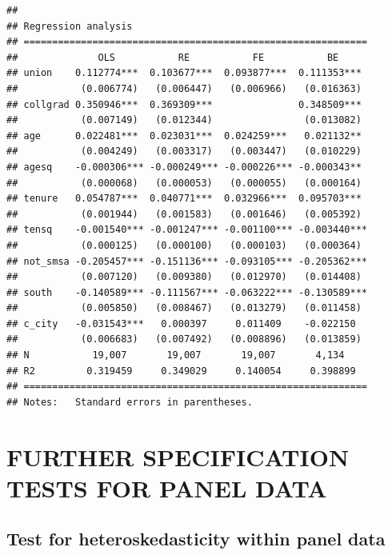 \documentclass[
]{article}
\begin{document}
\begin{verbatim}
## 
## Regression analysis
## ============================================================
##              OLS           RE           FE           BE     
## union    0.112774***  0.103677***  0.093877***  0.111353*** 
##           (0.006774)   (0.006447)   (0.006966)   (0.016363) 
## collgrad 0.350946***  0.369309***               0.348509*** 
##           (0.007149)   (0.012344)                (0.013082) 
## age      0.022481***  0.023031***  0.024259***   0.021132** 
##           (0.004249)   (0.003317)   (0.003447)   (0.010229) 
## agesq    -0.000306*** -0.000249*** -0.000226*** -0.000343** 
##           (0.000068)   (0.000053)   (0.000055)   (0.000164) 
## tenure   0.054787***  0.040771***  0.032966***  0.095703*** 
##           (0.001944)   (0.001583)   (0.001646)   (0.005392) 
## tensq    -0.001540*** -0.001247*** -0.001100*** -0.003440***
##           (0.000125)   (0.000100)   (0.000103)   (0.000364) 
## not_smsa -0.205457*** -0.151136*** -0.093105*** -0.205362***
##           (0.007120)   (0.009380)   (0.012970)   (0.014408) 
## south    -0.140589*** -0.111567*** -0.063222*** -0.130589***
##           (0.005850)   (0.008467)   (0.013279)   (0.011458) 
## c_city   -0.031543***   0.000397     0.011409    -0.022150  
##           (0.006683)   (0.007492)   (0.008896)   (0.013859) 
## N           19,007       19,007       19,007       4,134    
## R2         0.319459     0.349029     0.140054     0.398899  
## ============================================================
## Notes:   Standard errors in parentheses.
\end{verbatim}

\hypertarget{further-specification-tests-for-panel-data}{%
\section{FURTHER SPECIFICATION TESTS FOR PANEL
DATA}\label{further-specification-tests-for-panel-data}}

\hypertarget{test-for-heteroskedasticity-within-panel-data}{%
\subsection{Test for heteroskedasticity within panel
data}\label{test-for-heteroskedasticity-within-panel-data}}
\end{document}

